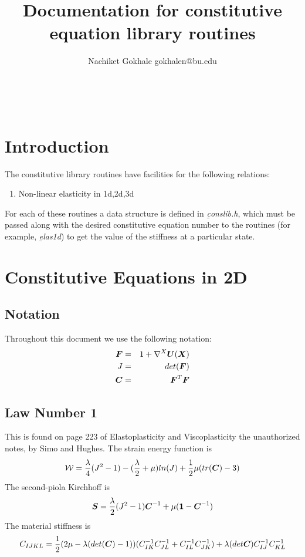 \documentclass[12pt]{article}
\begin{document}
\title{Documentation for constitutive equation library routines}
\author{Nachiket Gokhale gokhalen@bu.edu}
\maketitle
\
\section{Introduction}
The constitutive library routines have facilities for the following relations:

\begin{enumerate}
\item{Non-linear elasticity in 1d,2d,3d}
\end{enumerate}

For each of these routines a data structure is defined in {\textit{\b{conslib.h}}}, which must be passed along with the desired constitutive equation number to the routines (for example, \textit{\b{elas1d}}) to get the value of the stiffness at a particular state. 
\section{Constitutive Equations in 2D}
\subsection{Notation}
Throughout this document we use the following notation:
\begin{eqnarray}
\mbox{\boldmath{$F$}} &=& 1 + \nabla^{X}\mbox{\boldmath{$U$}}(\mbox{\boldmath{$X$}})\\
J &=& det(\mbox{\boldmath{$F$}})\\
\mbox{\boldmath{$C$}} &=& \mbox{\boldmath{$F$}}^{T}\mbox{\boldmath{$F$}}
\end{eqnarray}
\subsection{Law Number 1}
This is found on page 223 of Elastoplasticity and Viscoplasticity the unauthorized notes, by Simo and Hughes.
The strain energy function is 
\begin{eqnarray}
\mathcal{W} = \frac{\lambda}{4}(J^2 -1) - (\frac{\lambda}{2} + \mu)ln(J) + \frac{1}{2}\mu(tr(\mbox{\boldmath{$C$}}) - 3)
\end{eqnarray}
The second-piola Kirchhoff is
\begin{eqnarray}
\mbox{\boldmath{$S$}}  = \frac{\lambda}{2}(J^2-1)\mbox{\boldmath{$C$}}^{-1} + \mu(\mbox{\boldmath{$1$}} - \mbox{\boldmath{$C$}}^{-1})
\end{eqnarray} 
The material stiffness is 
\begin{eqnarray}
C_{IJKL} = \frac{1}{2}(2\mu - \lambda(det(\mbox{\boldmath{$C$}}) - 1))(C^{-1}_{IK}C^{-1}_{JL} + C^{-1}_{IL}C^{-1}_{JK}) + \lambda({det{\mbox{\boldmath{$C$}}}})C^{-1}_{IJ}C^{-1}_{KL}
\end{eqnarray}
\end{document}
